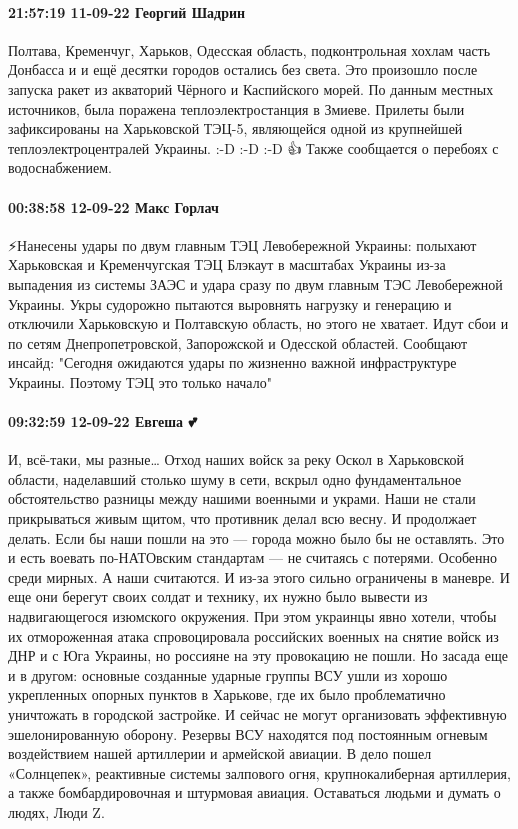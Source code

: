 \paragraph{21:57:19 11-09-22 Георгий Шадрин}

Полтава, Кременчуг, Харьков, Одесская область, подконтрольная хохлам часть Донбасса и и ещё десятки городов остались без света.
Это произошло после запуска ракет из акваторий Чёрного и Каспийского морей.
По данным местных источников, была поражена теплоэлектростанция в Змиеве.
Прилеты были зафиксированы на Харьковской ТЭЦ-5, являющейся одной из крупнейшей теплоэлектроцентралей Украины. :-D :-D :-D 👍
Также сообщается о перебоях с водоснабжением.

\paragraph{00:38:58 12-09-22 Макс Горлач}

⚡️Нанесены удары по двум главным ТЭЦ Левобережной Украины: полыхают Харьковская и Кременчугская ТЭЦ
Блэкаут в масштабах Украины из-за выпадения из системы ЗАЭС и удара сразу по двум главным ТЭС Левобережной Украины. Укры судорожно пытаются выровнять нагрузку и генерацию и отключили Харьковскую и Полтавскую область, но этого не хватает.
Идут сбои и по сетям Днепропетровской, Запорожской и Одесской областей.
Сообщают инсайд: "Сегодня ожидаются удары по жизненно важной инфраструктуре Украины.
Поэтому ТЭЦ это только начало"

\paragraph{09:32:59 12-09-22 Евгеша 💕}

И, всё-таки, мы разные…
Отход наших войск за реку Оскол в Харьковской области, наделавший столько шуму в сети, вскрыл одно фундаментальное обстоятельство разницы между нашими военными и украми. Наши не стали прикрываться живым щитом, что противник делал всю весну. И продолжает делать. Если бы наши пошли на это — города можно было бы не оставлять. Это и есть воевать по-НАТОвским стандартам — не считаясь с потерями. Особенно среди мирных.
А наши считаются. И из-за этого сильно ограничены в маневре. И еще они берегут своих солдат и технику, их нужно было вывести из надвигающегося изюмского окружения. При этом украинцы явно хотели, чтобы их отмороженная атака спровоцировала российских военных на снятие войск из ДНР и с Юга Украины, но россияне на эту провокацию не пошли.
Но засада еще и в другом: основные созданные ударные группы ВСУ ушли из хорошо укрепленных опорных пунктов в Харькове, где их было проблематично уничтожать в городской застройке. И сейчас не могут организовать эффективную эшелонированную оборону. Резервы ВСУ находятся под постоянным огневым воздействием нашей артиллерии и армейской авиации. В дело пошел «Солнцепек», реактивные системы залпового огня, крупнокалиберная артиллерия, а также бомбардировочная и штурмовая авиация.
Оставаться людьми и думать о людях, Люди Z.

